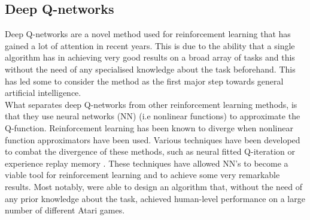 \subsection{Deep Q-networks}
Deep Q-networks \cite{mnih2013playing} are a novel method used for reinforcement learning that has gained a lot of attention in recent years. This is due to the ability that a single algorithm has in achieving very good results on a broad array of tasks and this without the need of any specialised knowledge about the task beforehand. This has led some to consider the method as the first major step towards general artificial intelligence.\\
What separates deep Q-networks from other reinforcement learning methods, is that they use neural networks (NN) (i.e nonlinear functions) to approximate the Q-function. Reinforcement learning has been known to diverge when nonlinear function approximators have been used. Various techniques have been developed to combat the divergence of these methods, such as neural fitted Q-iteration \cite{riedmiller2005neural} or experience replay memory \cite{Mnih2015}. These techniques have allowed NN's to become a viable tool for reinforcement learning and to achieve some very remarkable results. Most notably, \cite{Mnih2015} were able to design an algorithm that, without the need of any prior knowledge about the task, achieved human-level performance on a large number of different Atari games.


































